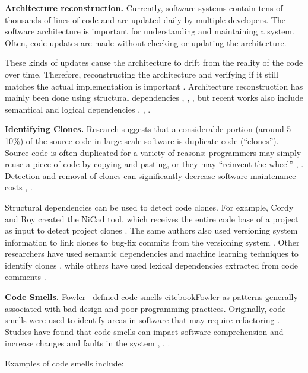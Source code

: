 \textbf{Architecture reconstruction.}
Currently, software systems contain tens of thousands of lines of code and are updated daily by multiple developers. The software architecture is important for understanding and maintaining a system. Often, code updates are made without checking or updating the architecture.

These kinds of updates cause the architecture to drift from the reality of the code over time. Therefore, reconstructing the architecture and verifying if it still matches the actual implementation is important \cite{RecoverySartipi, model-bennett, Kalliamvakou2016}. Architecture reconstruction has mainly been done using structural dependencies \cite{sar}, \cite{PagerankENASE}, \cite{Bass-archreconstruction}, but recent works also include semantical and logical dependencies \cite{b13}, \cite{corazza2}, \cite{maletic}.

\textbf{Identifying Clones.} 
Research suggests that a considerable portion (around 5-10\%) of the source code in large-scale software is duplicate code (“clones”). Source code is often duplicated for a variety of reasons: programmers may simply reuse a piece of code by copying and pasting, or they may “reinvent the wheel” \cite{ClonesMayrand}, \cite{clones}. Detection and removal of clones can significantly decrease software maintenance costs \cite{CloneDetection}, \cite{cloneKamiya}.

Structural dependencies can be used to detect code clones. For example, Cordy and Roy created the NiCad tool, which receives the entire code base of a project as input to detect project clones \cite{clones-nicad}. The same authors also used versioning system information to link clones to bug-fix commits from the versioning system \cite{clones-nicad-git}. Other researchers have used semantic dependencies and machine learning techniques to identify clones \cite{clones-ml}, while others have used lexical dependencies extracted from code comments \cite{clones-comments}.

\textbf{Code Smells.}  
Fowler \ defined code smells cite{bookFowler} as patterns generally associated with bad design and poor programming practices. Originally, code smells were used to identify areas in software that may require refactoring \cite{articlesmells}. Studies have found that code smells can impact software comprehension and increase changes and faults in the system \cite{5741260}, \cite{5328703}, \cite{articlefault-proneness}.

Examples of code smells include:

